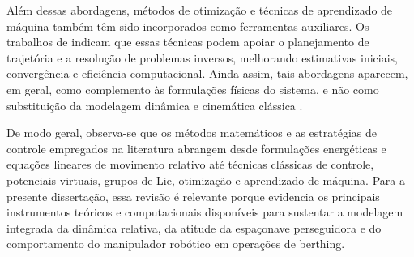 Além dessas abordagens, métodos de otimização e técnicas de aprendizado de máquina também têm sido incorporados como ferramentas auxiliares. Os trabalhos de \cite{santos2022machine,santos2023physics,santos2022uncertainty} indicam que essas técnicas podem apoiar o planejamento de trajetória e a resolução de problemas inversos, melhorando estimativas iniciais, convergência e eficiência computacional. Ainda assim, tais abordagens aparecem, em geral, como complemento às formulações físicas do sistema, e não como substituição da modelagem dinâmica e cinemática clássica \cite{santos2022machine,santos2023physics,santos2022uncertainty}.

De modo geral, observa-se que os métodos matemáticos e as estratégias de controle empregados na literatura abrangem desde formulações energéticas e equações lineares de movimento relativo até técnicas clássicas de controle, potenciais virtuais, grupos de Lie, otimização e aprendizado de máquina. Para a presente dissertação, essa revisão é relevante porque evidencia os principais instrumentos teóricos e computacionais disponíveis para sustentar a modelagem integrada da dinâmica relativa, da atitude da espaçonave perseguidora e do comportamento do manipulador robótico em operações de berthing.
